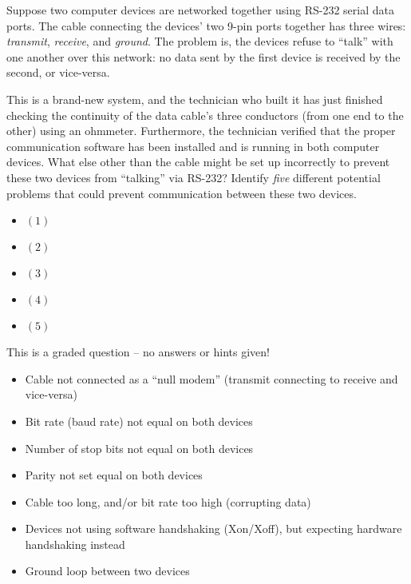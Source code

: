 

Suppose two computer devices are networked together using RS-232 serial data ports.  The cable connecting the devices' two 9-pin ports together has three wires: {\it transmit}, {\it receive}, and {\it ground}.  The problem is, the devices refuse to ``talk'' with one another over this network: no data sent by the first device is received by the second, or vice-versa.

\vskip 10pt

This is a brand-new system, and the technician who built it has just finished checking the continuity of the data cable's three conductors (from one end to the other) using an ohmmeter.  Furthermore, the technician verified that the proper communication software has been installed and is running in both computer devices.  What else other than the cable might be set up incorrectly to prevent these two devices from ``talking'' via RS-232?  Identify {\it five} different potential problems that could prevent communication between these two devices.

\vskip 20pt

\begin{itemize}
\item{$(1)$}
\vskip 70pt 
\item{$(2)$} 
\vskip 70pt 
\item{$(3)$} 
\vskip 70pt 
\item{$(4)$} 
\vskip 70pt 
\item{$(5)$} 
\end{itemize}

\vfil

\eject






This is a graded question -- no answers or hints given!







\begin{itemize}
\item{} Cable not connected as a ``null modem'' (transmit connecting to receive and vice-versa)
\item{} Bit rate (baud rate) not equal on both devices
\item{} Number of stop bits not equal on both devices
\item{} Parity not set equal on both devices
\item{} Cable too long, and/or bit rate too high (corrupting data)
\item{} Devices not using software handshaking (Xon/Xoff), but expecting hardware handshaking instead
\item{} Ground loop between two devices
\end{itemize}

